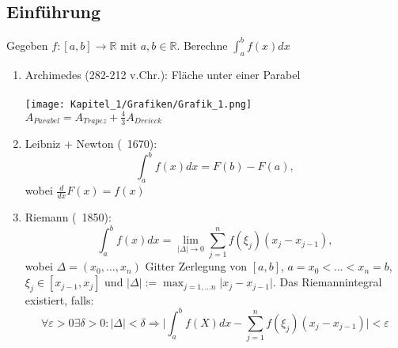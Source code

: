 \subsection{Einführung}

\begin{problem}
Gegeben $f: [a,b] \rightarrow \mathbb{R}$ mit $a, b \in \mathbb{R}$.
Berechne $\int_a^b f(x) dx $
\end{problem}

\begin{example}\leavevmode
\begin{enumerate}
  \item Archimedes (282-212 v.Chr.): Fläche unter einer Parabel \\ \\
    \texttt{[image: Kapitel\_1/Grafiken/Grafik\_1.png]} \\
    $A_{Parabel} = A_{Trapez} + \frac{4}{3} A_{Dreieck}$
  \item Leibniz + Newton (~1670):
    $$ \int_a^b f(x) dx = F(b) - F(a),$$ wobei $\frac{d}{dx} F(x) = f(x)$
  \item Riemann (~1850): 
    $$ \int_a^b f(x) dx = \lim\limits_{\vert \Delta \vert \to 0} \sum_{j=1}^n f(\xi_j)(x_j - x_{j-1}),$$
    wobei $\Delta = (x_0,...,x_n)$ Gitter Zerlegung von $[a, b]$, $a=x_0 < ...< x_n = b$, $\xi_j \in [x_{j-1}, x_j]$ und $\vert \Delta \vert := \max_{j=1,...n} \vert x_j - x_{j-1} \vert$.
    Das Riemannintegral existiert, falls: 
    $$ \forall \varepsilon > 0 \exists \delta > 0: \vert \Delta \vert < \delta \Rightarrow \vert \int_a^b f(X) dx - \sum_{j=1}^n f(\xi_j)(x_j-x_{j-1}) \vert < \varepsilon $$
\end{enumerate}
\end{example}

\begin{comment}[Approximation von Integralen]\leavevmode
\begin{enumerate}
  \item (linke) Rechtecksregel: 
    $$\int_{x_{j-1}}^{x_{j-1}+h} f(x) dx \approx h f(x_{j-1})$$
    $$\int_a^b f(x) dx = \sum_{j=1}^n \int_{x_{j-1}}^{x_j} f(x)dx \approx \sum_{j=1}^n f(x_{j-1}) (x_j-x_{j-1})$$
  \item Mittelpunktsregel:
    $$\int_{x_{j}}^{x_{j}+h} f(x) dx \approx f\left(\frac{x_j+x_j+h}{2}\right)h$$
    $$\int_a^bf(x)dx \approx \sum_{j=1}^n f\left( \frac{x_{j-1} + x_j}{2}\right) (x_j - x_{j-1})$$
    Da mit Hilfe der Transformationsformel sich jedes Integral $\int_{x_{j-1}}^{x_j}$ auf ein Integral $\int_a^b$ transformieren lässt, betrachten wir ohne Einschränkungen Integrale von $0$ bis $1$. Nutze dazu die Abb. $[a, b] \rightarrow [x_{j-1}, x_j], t \mapsto x_{j-1} + t(x_j - x_{j-1})$.
    $$ \int_{x_{j-1}}^{x_j} f(x) dx = \int_0^1 \underbrace{f\left( x_{j-1} + t(x_j - x_{j-1})\right)}_{:= g_{j-1}(t)} (x_j - x_{j-1})dt = \int_0^1 g_{j-1}(t)(x_j-x_{j-1})dt$$
\end{enumerate}
\end{comment}


